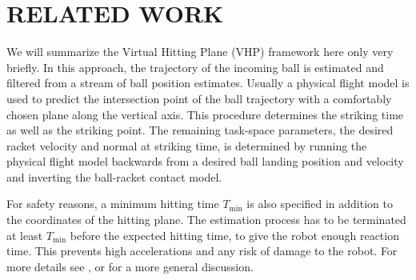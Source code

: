 \section{RELATED WORK}\label{relatedWork}

We will summarize the Virtual Hitting Plane (VHP) framework here only very briefly. In this approach, the trajectory of the incoming ball is estimated and filtered from a stream of ball position estimates. Usually a physical flight model is used to predict the intersection point of the ball trajectory with a comfortably chosen plane along the vertical axis. This procedure determines the striking time as well as the striking point. The remaining task-space parameters, the desired racket velocity and normal at striking time, is determined by running the physical flight model backwards from a desired ball landing position and velocity and inverting the ball-racket contact model.

For safety reasons, a minimum hitting time $T_{\textrm{min}}$ is also specified in addition to the coordinates of the hitting plane. The estimation process has to be terminated at least $T_{\textrm{min}}$ before the expected hitting time, to give the robot enough reaction time. This prevents high accelerations and any risk of damage to the robot. For more details see \cite{Muelling13}, or \cite{Matsushima05} for a more general discussion. 


